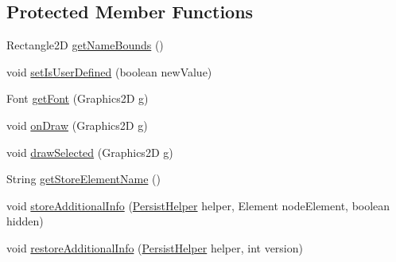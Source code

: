 \subsection*{Protected Member Functions}
\begin{DoxyCompactItemize}
\item 
Rectangle2\-D \hyperlink{classorg_1_1tzi_1_1use_1_1gui_1_1views_1_1diagrams_1_1elements_1_1_edge_property_a0911ad7c6a46a9d050b4a6f8f47a3074}{get\-Name\-Bounds} ()
\item 
void \hyperlink{classorg_1_1tzi_1_1use_1_1gui_1_1views_1_1diagrams_1_1elements_1_1_edge_property_ab5424d5a227eb4075ef8c0fa6835ad7b}{set\-Is\-User\-Defined} (boolean new\-Value)
\item 
Font \hyperlink{classorg_1_1tzi_1_1use_1_1gui_1_1views_1_1diagrams_1_1elements_1_1_edge_property_a276392c3f3077fd1a291bae2c1c5be20}{get\-Font} (Graphics2\-D g)
\item 
void \hyperlink{classorg_1_1tzi_1_1use_1_1gui_1_1views_1_1diagrams_1_1elements_1_1_edge_property_a3ceb674c42566647a6e157520348c9cf}{on\-Draw} (Graphics2\-D g)
\item 
void \hyperlink{classorg_1_1tzi_1_1use_1_1gui_1_1views_1_1diagrams_1_1elements_1_1_edge_property_a96c215c39eb73488c0ba9a0d322323c5}{draw\-Selected} (Graphics2\-D g)
\item 
String \hyperlink{classorg_1_1tzi_1_1use_1_1gui_1_1views_1_1diagrams_1_1elements_1_1_edge_property_acd3a2059dbba208e1a8647b7052c8286}{get\-Store\-Element\-Name} ()
\item 
void \hyperlink{classorg_1_1tzi_1_1use_1_1gui_1_1views_1_1diagrams_1_1elements_1_1_edge_property_abecc40abda7fafbf30ef431f3412575d}{store\-Additional\-Info} (\hyperlink{classorg_1_1tzi_1_1use_1_1gui_1_1util_1_1_persist_helper}{Persist\-Helper} helper, Element node\-Element, boolean hidden)
\item 
void \hyperlink{classorg_1_1tzi_1_1use_1_1gui_1_1views_1_1diagrams_1_1elements_1_1_edge_property_ad0e52fed46f8c346e02e16c87a3b3517}{restore\-Additional\-Info} (\hyperlink{classorg_1_1tzi_1_1use_1_1gui_1_1util_1_1_persist_helper}{Persist\-Helper} helper, int version)
\end{DoxyCompactItemize}
